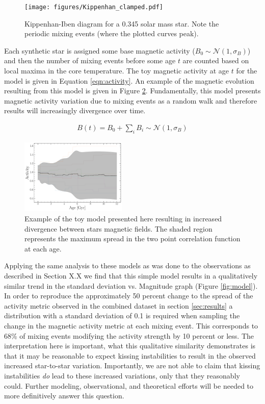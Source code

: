 \begin{figure}
  \centering
  \texttt{[image: figures/Kippenhan\_clamped.pdf]}
  \caption{Kippenhan-Iben diagram for a 0.345 solar mass star. Note the
  periodic mixing events (where the plotted curves peak).}
  \label{fig:kippenhan}
\end{figure}

Each synthetic star is assigned some base magnetic activity ($B_{0} \sim
\mathcal{N}(1, \sigma_{B})$) and then the number of mixing events before some age $t$
are counted based on local maxima in the core temperature. The toy magnetic
activity at age $t$ for the model is given in Equation \ref{eqn:activity}. An
example of the magnetic evolution resulting from this model is given in Figure
\ref{fig:simpleB}. Fundamentally, this model presents magnetic
activity variation due to mixing events as a random walk and therefore results will
increasingly divergence over time.

\begin{align}\label{eqn:activity}
  B(t) = B_{0} + \sum_{i}B_{i} \sim \mathcal{N}(1, \sigma_{B}) 
\end{align}

\begin{figure}
  \centering
  \includegraphics[width=0.45\textwidth]{figures/simpleBEvolution.pdf}
  \caption{Example of the toy model presented here resulting in increased
  divergence between stars magnetic fields. The shaded region represents the
  maximum spread in the two point correlation function at each age.}
  \label{fig:simpleB}
\end{figure}

Applying the same analysis to these models as was done to the observations as
described in Section {\color{red} X.X} we find that this simple model results
in a qualitatively similar trend in the standard deviation vs. Magnitude graph
(Figure \ref{fig:model}). In order to reproduce the approximately 50 percent
change to the spread of the activity metric observed in the combined dataset in
section \ref{sec:results} a distribution with a standard deviation of 0.1 is required when sampling the change in the magnetic activity metric at each mixing event. This corresponds to 68\% of mixing events modifying the activity strength by 10 percent or less. The interpretation here is important, what
this qualitative similarity demonstrates is that it may be reasonable to expect
kissing instabilities to result in the observed increased star-to-star
variation. Importantly, we are not able to claim that kissing instabilities
\textit{do} lead to these increased variations, only that they reasonably
could. Further modeling, observational, and theoretical efforts will be needed
to more definitively answer this question.

